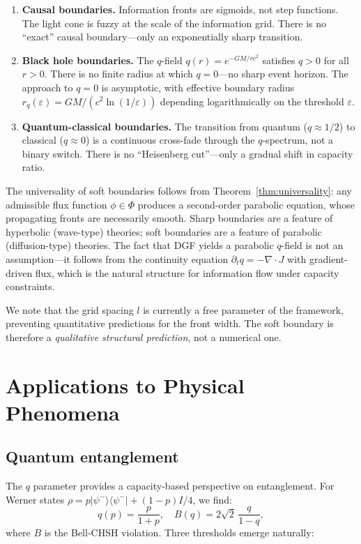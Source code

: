 \documentclass[12pt]{article}
\begin{document}
\begin{enumerate}
\item \textbf{Causal boundaries.} Information fronts are sigmoids, not step functions. The light cone is fuzzy at the scale of the information grid. There is no ``exact'' causal boundary---only an exponentially sharp transition.

\item \textbf{Black hole boundaries.} The $q$-field $q(r)=e^{-GM/rc^2}$ satisfies $q>0$ for all $r>0$. There is no finite radius at which $q=0$---no sharp event horizon. The approach to $q=0$ is asymptotic, with effective boundary radius $r_q(\varepsilon) = GM/(c^2\ln(1/\varepsilon))$ depending logarithmically on the threshold $\varepsilon$.

\item \textbf{Quantum-classical boundaries.} The transition from quantum ($q\approx 1/2$) to classical ($q\approx 0$) is a continuous cross-fade through the $q$-spectrum, not a binary switch. There is no ``Heisenberg cut''---only a gradual shift in capacity ratio.
\end{enumerate}

The universality of soft boundaries follows from Theorem~\ref{thm:universality}: any admissible flux function $\phi\in\Phi$ produces a second-order parabolic equation, whose propagating fronts are necessarily smooth. Sharp boundaries are a feature of hyperbolic (wave-type) theories; soft boundaries are a feature of parabolic (diffusion-type) theories. The fact that DGF yields a parabolic $q$-field is not an assumption---it follows from the continuity equation $\partial_t q = -\nabla\cdot J$ with gradient-driven flux, which is the natural structure for information flow under capacity constraints.

We note that the grid spacing $l$ is currently a free parameter of the framework, preventing quantitative predictions for the front width. The soft boundary is therefore a \emph{qualitative structural prediction}, not a numerical one.

\section{Applications to Physical Phenomena}

\subsection{Quantum entanglement}

The $q$ parameter provides a capacity-based perspective on entanglement. For Werner states $\rho = p|\psi^-\rangle\langle\psi^-|+(1-p)I/4$, we find:
\begin{equation}
q(p) = \frac{p}{1+p}, \quad B(q) = 2\sqrt{2}\,\frac{q}{1-q},
\end{equation}
where $B$ is the Bell-CHSH violation. Three thresholds emerge naturally:
\end{document}
